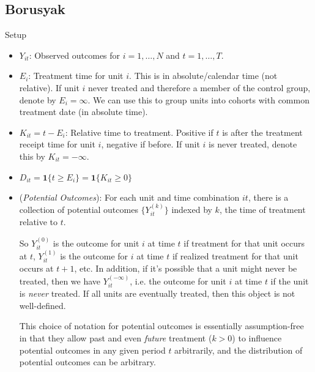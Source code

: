 \documentclass[12pt]{article}
\theoremstyle{plain}
\theoremstyle{definition}
\theoremstyle{remark}
\begin{document}
\clearpage
\subsection{Borusyak}

Setup
\begin{itemize}
  \item $Y_{it}$: Observed outcomes for $i=1,\ldots,N$
    and $t=1,\ldots,T$.
  \item $E_i$:
    Treatment time for unit $i$.
    This is in absolute/calendar time (not relative).
    If unit $i$ never treated and therefore a member of the control
    group, denote by $E_i=\infty$.
    We can use this to group units into cohorts with common treatment
    date (in absolute time).
  \item $K_{it}=t-E_i$:
    Relative time to treatment.
    Positive if $t$ is after the treatment receipt time for unit $i$,
    negative if before.
    If unit $i$ is never treated, denote this by $K_{it}=-\infty$.
  \item $D_{it}=\mathbf{1}\{t\geq E_i\}=\mathbf{1}\{K_{it}\geq 0\}$

  \item (\emph{Potential Outcomes}):
    For each unit and time combination $it$, there is a collection of
    potential outcomes $\{Y_{it}^{(k)}\}$ indexed by $k$, the time of
    treatment relative to $t$.

    So $Y_{it}^{(0)}$ is the outcome for unit $i$ at time $t$ if
    treatment for that unit occurs at $t$, $Y_{it}^{(1)}$ is the outcome
    for $i$ at time $t$ if realized treatment for that unit occurs at
    $t+1$, etc.
    In addition, if it's possible that a unit might never be treated,
    then we have $Y_{it}^{(-\infty)}$, i.e. the outcome for unit $i$ at
    time $t$ if the unit is \emph{never} treated.
    If all units are eventually treated, then this object is not
    well-defined.

    This choice of notation for potential outcomes is essentially
    assumption-free in that they allow past and even \emph{future}
    treatment ($k>0$) to influence potential outcomes in any given
    period $t$ arbitrarily, and the distribution of potential outcomes
    can be arbitrary.


\end{itemize}
\end{document}
